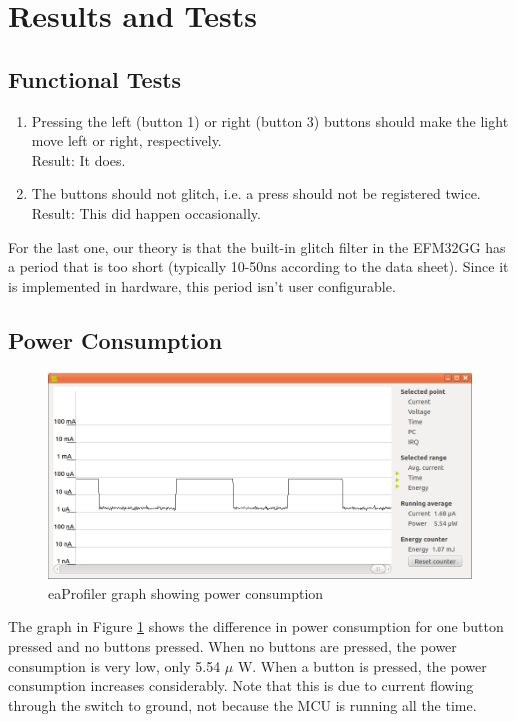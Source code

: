 \documentclass[a4paper, 12pt]{article}
\begin{document}
\section{Results and Tests} %
\label{sec:results_and_tests}
	\subsection{Functional Tests} %
	\label{sub:functional_tests}
		\begin{enumerate}
			\item Pressing the left (button 1) or right (button 3) buttons should make the light move left or right, respectively. \\
				  Result: It does.
			\item The buttons should not glitch, i.e. a press should not be registered twice.\\
				  Result: This did happen occasionally.
		\end{enumerate}
		For the last one, our theory is that the built-in glitch filter in the EFM32GG has a period that is too short (typically 10-50ns according to the data sheet). Since it is implemented in hardware, this period isn't user configurable.

	\subsection{Power Consumption} %
	\label{sub:power_consumption}
		\begin{figure}[!ht]
        \includegraphics[width=\textwidth]{eaprofiler}
        \caption{eaProfiler graph showing power consumption}
        \label{fig:profiler}
        \end{figure}
        The graph in Figure \ref{fig:profiler} shows the difference in power consumption for one button pressed and no buttons pressed. When no buttons are pressed, the power consumption is very low, only 5.54 $\mu$ W. When a button is pressed, the power consumption increases considerably. Note that this is due to current flowing through the switch to ground, not because the MCU is running all the time.
\end{document}
